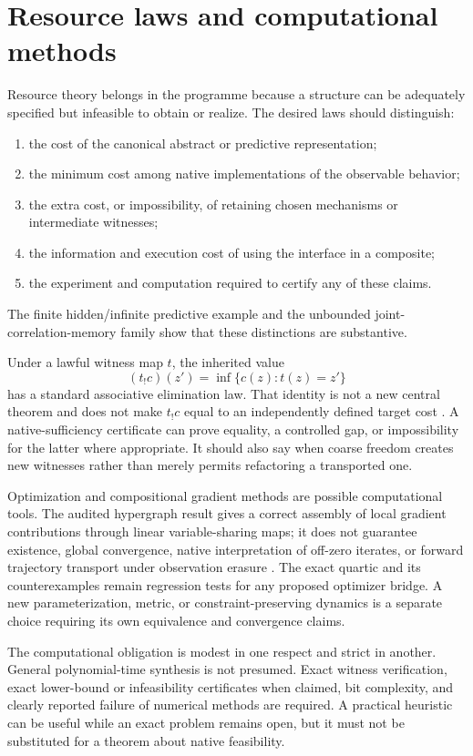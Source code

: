 \documentclass[11pt]{article}
\theoremstyle{remark}
\begin{document}
\section{Resource laws and computational methods}
\label{sec:resources}

Resource theory belongs in the programme because a structure can be adequately specified but infeasible to obtain or realize. The desired laws should distinguish:
\begin{enumerate}
\item the cost of the canonical abstract or predictive representation;
\item the minimum cost among native implementations of the observable behavior;
\item the extra cost, or impossibility, of retaining chosen mechanisms or intermediate witnesses;
\item the information and execution cost of using the interface in a composite;
\item the experiment and computation required to certify any of these claims.
\end{enumerate}
The finite hidden/infinite predictive example and the unbounded joint-correlation-memory family show that these distinctions are substantive.

Under a lawful witness map $t$, the inherited value
\[
 (t_!c)(z')=\inf\{c(z):t(z)=z'\}
\]
has a standard associative elimination law. That identity is not a new central theorem and does not make $t_!c$ equal to an independently defined target cost \cite{Interface,Variational,SteinSamuelson}. A native-sufficiency certificate can prove equality, a controlled gap, or impossibility for the latter where appropriate. It should also say when coarse freedom creates new witnesses rather than merely permits refactoring a transported one.

Optimization and compositional gradient methods are possible computational tools. The audited hypergraph result gives a correct assembly of local gradient contributions through linear variable-sharing maps; it does not guarantee existence, global convergence, native interpretation of off-zero iterates, or forward trajectory transport under observation erasure \cite{Budget,Interface,Hanks}. The exact quartic and its counterexamples remain regression tests for any proposed optimizer bridge. A new parameterization, metric, or constraint-preserving dynamics is a separate choice requiring its own equivalence and convergence claims.

The computational obligation is modest in one respect and strict in another. General polynomial-time synthesis is not presumed. Exact witness verification, exact lower-bound or infeasibility certificates when claimed, bit complexity, and clearly reported failure of numerical methods are required. A practical heuristic can be useful while an exact problem remains open, but it must not be substituted for a theorem about native feasibility.
\end{document}
